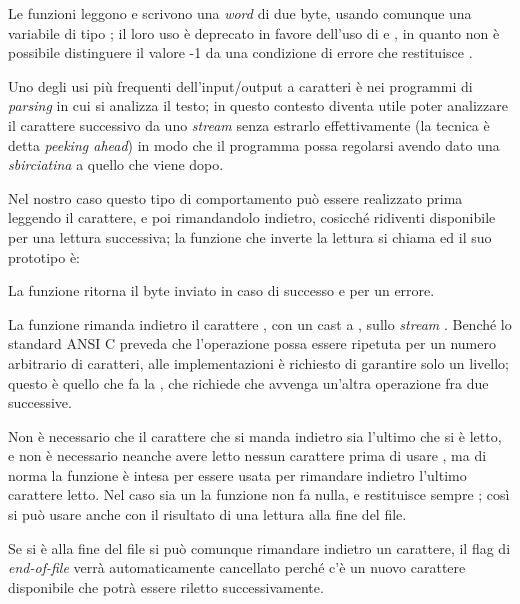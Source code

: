 Le funzioni leggono e scrivono una \textit{word} di due byte, usando comunque
una variabile di tipo ; il loro uso è deprecato in favore dell'uso
di  e , in quanto non è possibile distinguere il
valore -1 da una condizione di errore che restituisce .

Uno degli usi più frequenti dell'input/output a caratteri è nei programmi di
\textit{parsing} in cui si analizza il testo; in questo contesto diventa utile
poter analizzare il carattere successivo da uno \textit{stream} senza estrarlo
effettivamente (la tecnica è detta \textit{peeking ahead}) in modo che il
programma possa regolarsi avendo dato una \textsl{sbirciatina} a quello che
viene dopo.

Nel nostro caso questo tipo di comportamento può essere realizzato prima
leggendo il carattere, e poi rimandandolo indietro, cosicché ridiventi
disponibile per una lettura successiva; la funzione che inverte la
lettura si chiama  ed il suo prototipo è:

\begin{funcproto}{
}

{La funzione ritorna il byte inviato in caso di successo e  per un
  errore.}  
\end{funcproto}
 
La funzione rimanda indietro il carattere , con un cast a
, sullo \textit{stream} . Benché lo standard
ANSI C preveda che l'operazione possa essere ripetuta per un numero arbitrario
di caratteri, alle implementazioni è richiesto di garantire solo un livello;
questo è quello che fa la , che richiede che avvenga un'altra
operazione fra due  successive.

Non è necessario che il carattere che si manda indietro sia l'ultimo che si è
letto, e non è necessario neanche avere letto nessun carattere prima di usare
, ma di norma la funzione è intesa per essere usata per rimandare
indietro l'ultimo carattere letto.  Nel caso  sia un  la
funzione non fa nulla, e restituisce sempre ; così si può usare
 anche con il risultato di una lettura alla fine del file.

Se si è alla fine del file si può comunque rimandare indietro un carattere, il
flag di \textit{end-of-file} verrà automaticamente cancellato perché c'è un
nuovo carattere disponibile che potrà essere riletto successivamente.

